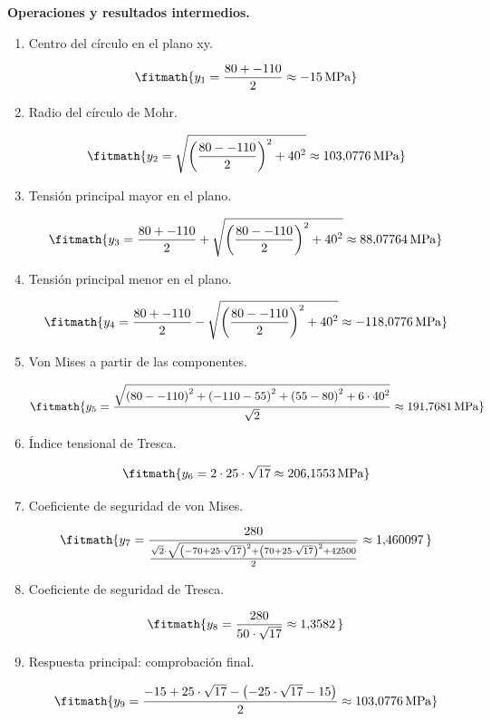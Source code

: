 \noindent\textbf{Operaciones y resultados intermedios.}

\begin{enumerate}

\item Centro del círculo en el plano xy.

\[\fitmath{y_{1}=\frac{80+-110}{2}\approx -15\,\mathrm{MPa}}\]

\item Radio del círculo de Mohr.

\[\fitmath{y_{2}=\sqrt{{\left(\frac{80--110}{2}\right)}^{2}+{40}^{2}}\approx 103{,}0776\,\mathrm{MPa}}\]

\item Tensión principal mayor en el plano.

\[\fitmath{y_{3}=\frac{80+-110}{2}+\sqrt{{\left(\frac{80--110}{2}\right)}^{2}+{40}^{2}}\approx 88{,}07764\,\mathrm{MPa}}\]

\item Tensión principal menor en el plano.

\[\fitmath{y_{4}=\frac{80+-110}{2}-\sqrt{{\left(\frac{80--110}{2}\right)}^{2}+{40}^{2}}\approx -118{,}0776\,\mathrm{MPa}}\]

\item Von Mises a partir de las componentes.

\[\fitmath{y_{5}=\frac{\sqrt{{\left(80--110\right)}^{2}+{\left(-110-55\right)}^{2}+{\left(55-80\right)}^{2}+6\cdot {40}^{2}}}{\sqrt{2}}\approx 191{,}7681\,\mathrm{MPa}}\]

\item Índice tensional de Tresca.

\[\fitmath{y_{6}=2\cdot 25\cdot \sqrt{17}\approx 206{,}1553\,\mathrm{MPa}}\]

\item Coeficiente de seguridad de von Mises.

\[\fitmath{y_{7}=\frac{280}{\frac{\sqrt{2}\cdot \sqrt{{\left(-70+25\cdot \sqrt{17}\right)}^{2}+{\left(70+25\cdot \sqrt{17}\right)}^{2}+42500}}{2}}\approx 1{,}460097\,}\]

\item Coeficiente de seguridad de Tresca.

\[\fitmath{y_{8}=\frac{280}{50\cdot \sqrt{17}}\approx 1{,}3582\,}\]

\item Respuesta principal: comprobación final.

\[\fitmath{y_{9}=\frac{-15+25\cdot \sqrt{17}-\left(-25\cdot \sqrt{17}-15\right)}{2}\approx 103{,}0776\,\mathrm{MPa}}\]

\end{enumerate}
